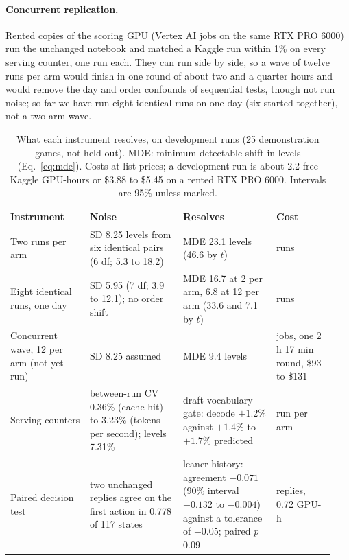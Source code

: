 \paragraph{Concurrent replication.}
Rented copies of the scoring GPU (Vertex AI jobs on the same RTX PRO 6000) run the unchanged notebook and matched a Kaggle run within 1\% on every serving counter, one run each. %
They can run side by side, so a wave of twelve runs per arm would finish in one round of about two and a quarter hours and would remove the day and order confounds of sequential tests, though not run noise; so far we have run eight identical runs on one day (six started together), not a two-arm wave. %

\begin{table}[t]
\caption{What each instrument resolves, on development runs (25 demonstration games, not held out). MDE: minimum detectable shift in levels (Eq.~\ref{eq:mde}). Costs at list prices; a development run is about 2.2 free Kaggle GPU-hours or \$3.88 to \$5.45 on a rented RTX PRO 6000. Intervals are 95\% unless marked.}\label{tab:instruments} %
\centering\footnotesize
\setlength{\tabcolsep}{3pt}
\begin{tabular}{@{}>{\raggedright\arraybackslash}p{0.23\linewidth}>{\raggedright\arraybackslash}p{0.27\linewidth}>{\raggedright\arraybackslash}p{0.27\linewidth}>{\raggedright\arraybackslash}p{0.17\linewidth}@{}}
\toprule
Instrument & Noise & Resolves & Cost \\
\midrule
Two runs per arm & SD 8.25 levels from six identical pairs (6 df; 5.3 to 18.2) & MDE 23.1 levels (46.6 by $t$) & 4 runs \\ %
Eight identical runs, one day & SD 5.95 (7 df; 3.9 to 12.1); no order shift & MDE 16.7 at 2 per arm, 6.8 at 12 per arm (33.6 and 7.1 by $t$) & 8 runs \\ %
Concurrent wave, 12 per arm (not yet run) & SD 8.25 assumed & MDE 9.4 levels & 24 jobs, one 2 h 17 min round, \$93 to \$131 \\ %
Serving counters & between-run CV 0.36\% (cache hit) to 3.23\% (tokens per second); levels 7.31\% & draft-vocabulary gate: decode $+1.2\%$ against $+1.4\%$ to $+1.7\%$ predicted & 1 run per arm \\ %
Paired decision test & two unchanged replies agree on the first action in 0.778 of 117 states & leaner history: agreement $-0.071$ (90\% interval $-0.132$ to $-0.004$) against a tolerance of $-0.05$; paired $p$ 0.09 & 468 replies, 0.72 GPU-h \\ %
\bottomrule
\end{tabular}
\end{table}
